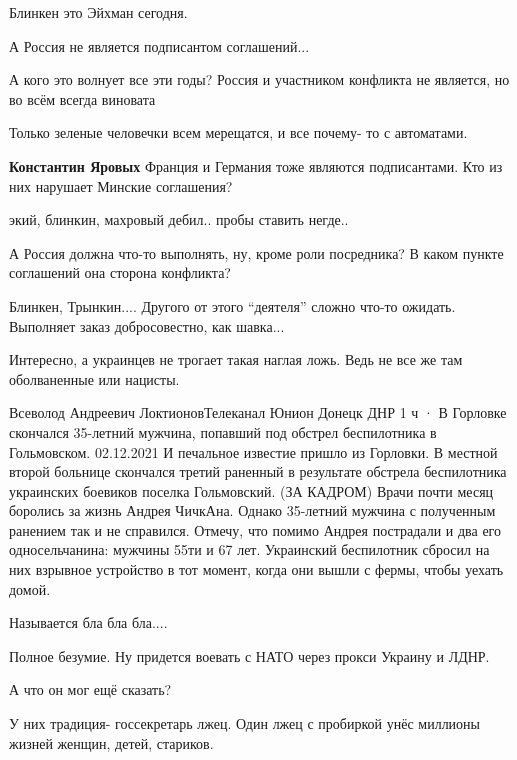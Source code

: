 \begin{itemize}
Блинкен это Эйхман сегодня.

А Россия не является подписантом соглашений...

\begin{itemize} %
А кого это волнует все эти годы? Россия и участником конфликта не является, но во всём всегда виновата

Только зеленые человечки всем мерещатся, и все почему- то с автоматами.

\textbf{Константин Яровых} Франция и Германия тоже являются подписантами. Кто из них нарушает Минские соглашения?
\end{itemize} %

экий, блинкин, махровый дебил.. пробы ставить негде..

А Россия должна что-то выполнять, ну, кроме роли посредника? В каком пункте соглашений она сторона конфликта?

Блинкен, Трынкин.... Другого от этого \enquote{деятеля} сложно что-то ожидать. Выполняет заказ добросовестно, как шавка...

Интересно, а украинцев не трогает такая наглая ложь. Ведь не все же там оболваненные или нацисты.

Всеволод Андреевич ЛоктионовТелеканал Юнион Донецк ДНР
1 ч ·
В Горловке скончался 35-летний мужчина, попавший под обстрел беспилотника в Гольмовском. 02.12.2021
И печальное известие пришло из Горловки. В местной второй больнице скончался третий раненный в результате обстрела беспилотника украинских боевиков поселка Гольмовский. (ЗА КАДРОМ) Врачи почти месяц боролись за жизнь Андрея ЧичкАна. Однако 35-летний мужчина с полученным ранением так и не справился. Отмечу, что помимо Андрея пострадали и два его односельчанина: мужчины 55ти и 67 лет. Украинский беспилотник сбросил на них взрывное устройство в тот момент, когда они вышли с фермы, чтобы уехать домой.

Называется бла бла бла....

Полное безумие.
Ну придется воевать с НАТО через прокси Украину и ЛДНР.

А что он мог ещё сказать?

У них традиция- госсекретарь лжец. Один лжец с пробиркой унёс миллионы жизней женщин, детей, стариков.


\end{itemize}
